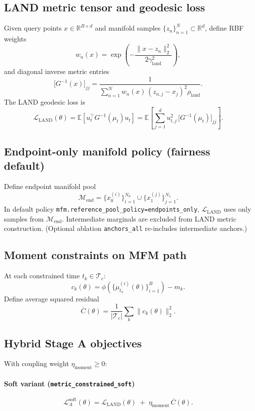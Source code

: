 \documentclass[11pt]{article}
\begin{document}
\subsection*{LAND metric tensor and geodesic loss}
Given query points $x\in\mathbb{R}^{B\times d}$ and manifold samples
$\{z_n\}_{n=1}^{N}\subset\mathbb{R}^d$, define RBF weights
\[
w_n(x)=\exp\!\left(-\frac{\|x-z_n\|_2^2}{2\gamma_{\mathrm{land}}^2}\right),
\]
and diagonal inverse metric entries
\[
\big[G^{-1}(x)\big]_{jj}
=
\frac{1}{
\sum_{n=1}^N w_n(x)\,(z_{n,j}-x_j)^2
\rho_{\mathrm{land}}
}.
\]
The LAND geodesic loss is
\[
\mathcal{L}_{\mathrm{LAND}}(\theta)
=
\mathbb{E}\left[u_t^\top G^{-1}(\mu_t)u_t\right]
=
\mathbb{E}\left[\sum_{j=1}^d u_{t,j}^2\,\big[G^{-1}(\mu_t)\big]_{jj}\right].
\]

\subsection*{Endpoint-only manifold policy (fairness default)}
Define endpoint manifold pool
\[
\mathcal{M}_{\mathrm{end}}=
\{x_0^{(i)}\}_{i=1}^{N_0}\cup\{x_1^{(j)}\}_{j=1}^{N_1}.
\]
In default policy \texttt{mfm.reference\_pool\_policy=endpoints\_only},
$\mathcal{L}_{\mathrm{LAND}}$ uses only samples from $\mathcal{M}_{\mathrm{end}}$.
Intermediate marginals are excluded from LAND metric construction.
(Optional ablation \texttt{anchors\_all} re-includes intermediate anchors.)

\subsection*{Moment constraints on MFM path}
At each constrained time $t_k\in\mathcal{T}_c$:
\[
c_k(\theta)=
\phi\!\left(\{\mu_{t_k}^{(i)}(\theta)\}_{i=1}^B\right)-m_k.
\]
Define average squared residual
\[
\overline{C}(\theta)=\frac{1}{|\mathcal{T}_c|}\sum_{k}\|c_k(\theta)\|_2^2.
\]

\subsection*{Hybrid Stage A objectives}
With coupling weight $\eta_{\mathrm{moment}}\ge 0$:

\paragraph{Soft variant (\texttt{metric\_constrained\_soft})}
\[
\mathcal{L}_{A}^{\mathrm{soft}}(\theta)
=
\mathcal{L}_{\mathrm{LAND}}(\theta)
\;+\;
\eta_{\mathrm{moment}}\,\overline{C}(\theta).
\]
\end{document}
